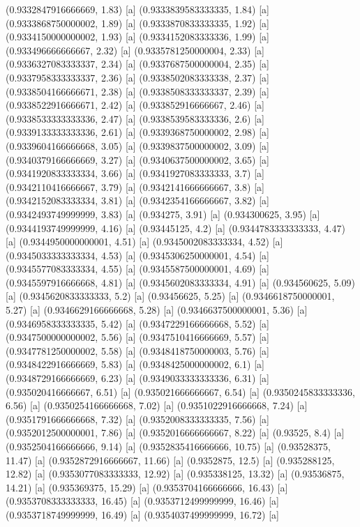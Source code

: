 {{{(0.9332847916666669, 1.83) [a] 
(0.9333839583333335, 1.84) [a] 
(0.9333868750000002, 1.89) [a] 
(0.9333870833333335, 1.92) [a] 
(0.9334150000000002, 1.93) [a] 
(0.9334152083333336, 1.99) [a] 
(0.933496666666667, 2.32) [a] 
(0.9335781250000004, 2.33) [a] 
(0.9336327083333337, 2.34) [a] 
(0.9337687500000004, 2.35) [a] 
(0.9337958333333337, 2.36) [a] 
(0.9338502083333338, 2.37) [a] 
(0.9338504166666671, 2.38) [a] 
(0.9338508333333337, 2.39) [a] 
(0.9338522916666671, 2.42) [a] 
(0.933852916666667, 2.46) [a] 
(0.9338533333333336, 2.47) [a] 
(0.9338539583333336, 2.6) [a] 
(0.9339133333333336, 2.61) [a] 
(0.9339368750000002, 2.98) [a] 
(0.9339604166666668, 3.05) [a] 
(0.9339837500000002, 3.09) [a] 
(0.9340379166666669, 3.27) [a] 
(0.9340637500000002, 3.65) [a] 
(0.9341920833333334, 3.66) [a] 
(0.9341927083333333, 3.7) [a] 
(0.9342110416666667, 3.79) [a] 
(0.9342141666666667, 3.8) [a] 
(0.9342152083333334, 3.81) [a] 
(0.9342354166666667, 3.82) [a] 
(0.9342493749999999, 3.83) [a] 
(0.934275, 3.91) [a] 
(0.934300625, 3.95) [a] 
(0.9344193749999999, 4.16) [a] 
(0.93445125, 4.2) [a] 
(0.9344783333333333, 4.47) [a] 
(0.9344950000000001, 4.51) [a] 
(0.9345002083333334, 4.52) [a] 
(0.9345033333333334, 4.53) [a] 
(0.9345306250000001, 4.54) [a] 
(0.9345577083333334, 4.55) [a] 
(0.9345587500000001, 4.69) [a] 
(0.9345597916666668, 4.81) [a] 
(0.9345602083333334, 4.91) [a] 
(0.934560625, 5.09) [a] 
(0.9345620833333333, 5.2) [a] 
(0.93456625, 5.25) [a] 
(0.9346618750000001, 5.27) [a] 
(0.9346629166666668, 5.28) [a] 
(0.9346637500000001, 5.36) [a] 
(0.9346958333333335, 5.42) [a] 
(0.9347229166666668, 5.52) [a] 
(0.9347500000000002, 5.56) [a] 
(0.9347510416666669, 5.57) [a] 
(0.9347781250000002, 5.58) [a] 
(0.9348418750000003, 5.76) [a] 
(0.9348422916666669, 5.83) [a] 
(0.9348425000000002, 6.1) [a] 
(0.9348729166666669, 6.23) [a] 
(0.9349033333333336, 6.31) [a] 
(0.935020416666667, 6.51) [a] 
(0.935021666666667, 6.54) [a] 
(0.9350245833333336, 6.56) [a] 
(0.9350254166666668, 7.02) [a] 
(0.9351022916666668, 7.24) [a] 
(0.9351791666666668, 7.32) [a] 
(0.9352008333333335, 7.56) [a] 
(0.9352012500000001, 7.86) [a] 
(0.9352016666666667, 8.22) [a] 
(0.93525, 8.4) [a] 
(0.9352504166666666, 9.14) [a] 
(0.9352835416666666, 10.75) [a] 
(0.93528375, 11.47) [a] 
(0.9352872916666667, 11.66) [a] 
(0.9352875, 12.5) [a] 
(0.935288125, 12.82) [a] 
(0.9353077083333333, 12.92) [a] 
(0.935338125, 13.32) [a] 
(0.93536875, 14.21) [a] 
(0.935369375, 15.29) [a] 
(0.9353704166666666, 16.43) [a] 
(0.9353708333333333, 16.45) [a] 
(0.9353712499999999, 16.46) [a] 
(0.9353718749999999, 16.49) [a] 
(0.9354037499999999, 16.72) [a] 
}}}
